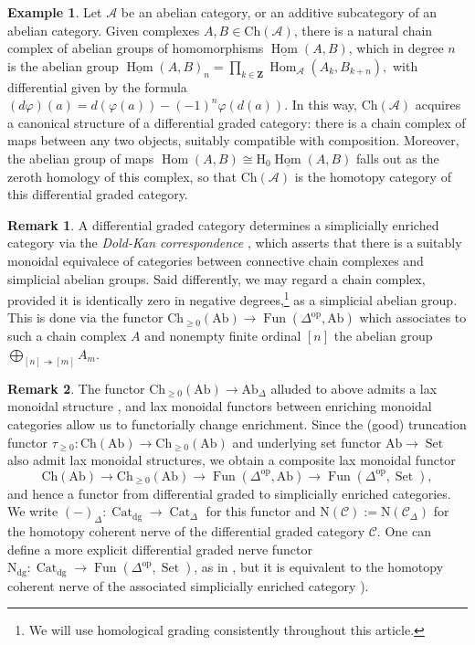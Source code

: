 \documentclass[12pt]{article}
\theoremstyle{definition}
\newtheorem{example}{Example}[subsection]
\newtheorem{remark}{Remark}[subsection]
\newcommand{\A}{\mathcal{A}}
\newcommand{\C}{\mathcal{C}}
\newcommand{\ZZ}{\mathbf{Z}}
\newcommand{\too}{\longrightarrow}
\newcommand{\op}{\mathrm{op}}
\DeclareMathOperator{\Cat}{Cat}
\DeclareMathOperator{\Fun}{Fun}
\DeclareMathOperator{\Hom}{Hom}
\DeclareMathOperator{\Set}{Set}
\newcommand{\Ab}{\mathrm{Ab}}
\begin{document}
\begin{example}
Let ${\mathcal{A}}$ be an abelian category, or an additive subcategory of an abelian category.
Given complexes ${A, B \in \mathrm{Ch}(\mathcal{A})}$, there is a natural chain complex of abelian groups of homomorphisms $\underline{\Hom}(A, B)$, which in degree $n$ is the abelian group
$
{\underline{\Hom}(A, B)_n = \prod_{k\in\ZZ} \Hom_{\mathcal{A}}(A_k, B_{k+n})},
$
with differential given by the formula
$
(d\varphi)(a)=d(\varphi(a))-(-1)^n\varphi(d(a)).
$
In this way, ${\mathrm{Ch}(\mathcal{A})}$ acquires a canonical structure of a differential graded category: there is a chain complex of maps between any two objects, suitably compatible with composition.
Moreover, the abelian group of maps $\Hom(A,B)\cong \mathrm{H}_0\underline{\Hom}(A,B)$ falls out as the zeroth homology of this complex, so that $\mathrm{Ch}(\A)$ is the homotopy category of this differential graded category.
\end{example}


\begin{remark}\label{DK}
A differential graded category determines a simplicially enriched category via the {\em Dold-Kan correspondence}
 \cite{Wei94}, which asserts that there is a suitably monoidal equivalece of categories between connective chain complexes and simplicial abelian groups.
Said differently, we may regard a chain complex, provided it is identically zero in negative degrees,\footnote{We will use homological grading consistently throughout this article.}
as a simplicial abelian group.
This is done via the functor $\mathrm{Ch}_{\geq 0}( {\Ab}) \to\Fun(\Delta^{\op},\Ab)$ which associates to such a chain complex $A$ and nonempty finite ordinal $[n]$ the abelian group $\underset{[n]\twoheadrightarrow [m]}{\bigoplus}A_m$.
\end{remark}
\begin{remark}\label{dgn}
The functor $\mathrm{Ch}_{\geq 0}(\Ab)\to\Ab_\Delta$ alluded to above admits a lax monoidal structure \cite{Wei94}, and lax monoidal functors between enriching monoidal categories allow us to functorially change enrichment.
Since the (good) truncation functor $\tau_{\geq 0}:\mathrm{Ch}(\Ab)\to\mathrm{Ch}_{\geq 0}(\Ab)$ and underlying set functor $\Ab\to\Set$ also admit lax monoidal structures, we obtain a composite lax monoidal functor
\[
\mathrm{Ch}(\Ab)\too\mathrm{Ch}_{\geq 0}(\Ab)\too\Fun(\Delta^{\op},\Ab)\too\Fun(\Delta^{\op},\Set),
\]
and hence a functor from differential graded to simplicially enriched categories.
We write $(-)_\Delta:\Cat_\mathrm{dg}\to\Cat_\Delta$ for this functor and $\mathrm{N}(\C):=\mathrm{N}(\C_\Delta)$ for the homotopy coherent nerve of the differential graded category $\C$.
One can define a more explicit differential graded nerve functor $\mathrm{N_{dg}}:\Cat_\mathrm{dg}\to\Fun(\Delta^{\op},\Set)$, as in \cite[Construction 1.3.1.6]{HA}, but it is equivalent to the homotopy coherent nerve of the associated simplicially enriched category \cite[Proposition 1.3.1.17]{HA}).
\end{remark}
\end{document}
